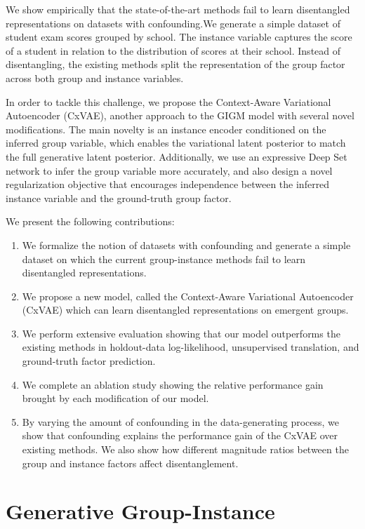 \documentclass[nohyperref]{article}
\theoremstyle{plain}
\theoremstyle{definition}
\theoremstyle{remark}
\begin{document}
We show empirically that the state-of-the-art methods fail to learn disentangled representations on datasets with confounding.We generate a simple dataset of student exam scores grouped by school.  The instance variable captures the score of a student in relation to the distribution of scores at their school. Instead of disentangling, the existing methods split the representation of the group factor across both group and instance variables. 

In order to tackle this challenge, we propose the Context-Aware Variational Autoencoder (CxVAE), another approach to the GIGM model with several novel modifications. The main novelty is an instance encoder conditioned on the inferred group variable, which enables the variational latent posterior to match the full generative latent posterior.  Additionally, we use an expressive Deep Set network \citep{Zaheer2017DeepS} to infer the group variable more accurately, and also design a novel regularization objective that encourages independence between the inferred instance variable and the ground-truth group factor. 

We present the following contributions:
\begin{enumerate}
    \item We formalize the notion of datasets with confounding and generate a simple dataset on which the current group-instance methods fail to learn disentangled representations.
    \item We propose a new model, called the Context-Aware Variational Autoencoder (CxVAE) which can learn disentangled representations on emergent groups.
    \item We perform extensive evaluation showing that our model outperforms the existing methods in holdout-data log-likelihood, unsupervised translation, and ground-truth factor prediction.
    \item We complete an ablation study showing the relative performance gain brought by each modification of our model.
    \item By varying the amount of confounding in the data-generating process, we show that confounding explains the performance gain of the CxVAE over existing methods. We also show how different magnitude ratios between the group and instance factors affect disentanglement.
\end{enumerate}

\section{Generative Group-Instance}
\end{document}
